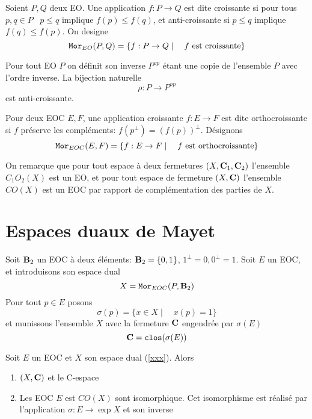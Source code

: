 Soient $P,Q$ deux EO. Une application $f:P\to Q$ est dite {\dff 
croissante} si pour tous $p,q\in P$ \ $p\le q$ implique $f(p)\le 
f(q)$, et {\dff anti-croissante} si $p\le q$ implique $f(q)\le 
f(p)$. On designe 
\begin{equation} 
{\tt Mor}_{EO}(P,Q) = \{f:P\to Q\mid\quad f\hbox{ est croissante}\} 
\label{moreo} 
\end{equation} 

Pour tout EO $P$ on d\'efinit son {\dff inverse} $P^{op}$ \'etant 
une copie de l'ensemble $P$ avec l'ordre inverse. La bijection 
naturelle 
\begin{equation} 
\rho:P\to P^{op} \label{rho} 
\end{equation} 
est anti-croissante. 

Pour deux EOC $E,F$, une application croissante $f:E\to F$ est dite 
{\dff orthocroissante} si $f$ pr\'eserve les compl\'ements: 
$f(p^\perp)=(f(p))^\perp$. D\'esignons 
\begin{equation} 
{\tt Mor}_{EOC}(E,F)=\{f:E\to F\mid\quad f\hbox{ est orthocroissante}\} 
\label{moreoc}  
\end{equation} 

On re\-ma\-r\-que que pour tout es\-pa\-ce \`a deux 
fer\-me\-tu\-res $(X,{\bf C}_1,{\bf C}_2)$ l'en\-sem\-b\-le $C_1O_2(X)$ est 
un EO, et pour tout es\-pa\-ce de fer\-me\-tu\-re $(X,{\bf C})$ 
l'en\-sem\-b\-le $CO(X)$ est un EOC par rap\-port de 
com\-p\-l\'e\-men\-ta\-tion des parties de $X$. 

\section{Espaces duaux de Mayet} 

Soit ${\bf B}_2$ un EOC \`a deux \'el\'ements: ${\bf B}_2=\{0,1\}$, $1^\perp=0, 
0^\perp=1$. Soit $E$ un EOC, et introduisons son espace dual 
\begin{equation} 
X={\tt Mor}_{EOC}(P,{\bf B}_2) \label{xxx} 
\end{equation} 
Pour tout $p\in E$ posons 
\[ \sigma(p)=\{x\in X\mid\quad x(p)=1\} \] 
et munissons l'ensemble $X$ avec la fermeture ${\bf C}$ engendr\'ee par 
$\sigma(E)$ 
\begin{equation} 
{\bf C}={\tt clos}(\sigma(E)) \label{ce} 
\end{equation} 

\begin{th} \label{thmayet} Soit $E$ un EOC et $X$ son espace dual 
(\ref{xxx}).  Alors \begin{enumerate} \item $(X,{\bf C})$ et le C-espace 
\item Les EOC $E$ est $CO(X)$ sont isomorphique. Cet isomorphisme 
est r\'ealis\'e par l'application $\sigma: E\to \exp X$ et son 
inverse 
\end{enumerate} 
\end{th} 
